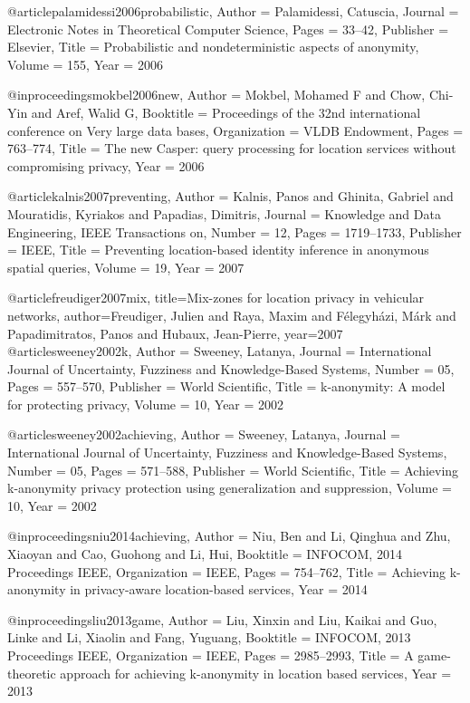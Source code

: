 {{{{{{{	@article{palamidessi2006probabilistic,
	Author = {Palamidessi, Catuscia},
	Journal = {Electronic Notes in Theoretical Computer Science},
	Pages = {33--42},
	Publisher = {Elsevier},
	Title = {Probabilistic and nondeterministic aspects of anonymity},
	Volume = {155},
	Year = {2006}}
	
	@inproceedings{mokbel2006new,
	Author = {Mokbel, Mohamed F and Chow, Chi-Yin and Aref, Walid G},
	Booktitle = {Proceedings of the 32nd international conference on Very large data bases},
	Organization = {VLDB Endowment},
	Pages = {763--774},
	Title = {The new Casper: query processing for location services without compromising privacy},
	Year = {2006}}
	
	@article{kalnis2007preventing,
	Author = {Kalnis, Panos and Ghinita, Gabriel and Mouratidis, Kyriakos and Papadias, Dimitris},
	Journal = {Knowledge and Data Engineering, IEEE Transactions on},
	Number = {12},
	Pages = {1719--1733},
	Publisher = {IEEE},
	Title = {Preventing location-based identity inference in anonymous spatial queries},
	Volume = {19},
	Year = {2007}}
	
	@article{freudiger2007mix,
	title={Mix-zones for location privacy in vehicular networks},
	author={Freudiger, Julien and Raya, Maxim and F{\'e}legyh{\'a}zi, M{\'a}rk and Papadimitratos, Panos and Hubaux, Jean-Pierre},
	year={2007}
	}
	@article{sweeney2002k,
	Author = {Sweeney, Latanya},
	Journal = {International Journal of Uncertainty, Fuzziness and Knowledge-Based Systems},
	Number = {05},
	Pages = {557--570},
	Publisher = {World Scientific},
	Title = {k-anonymity: A model for protecting privacy},
	Volume = {10},
	Year = {2002}}
	
	@article{sweeney2002achieving,
	Author = {Sweeney, Latanya},
	Journal = {International Journal of Uncertainty, Fuzziness and Knowledge-Based Systems},
	Number = {05},
	Pages = {571--588},
	Publisher = {World Scientific},
	Title = {Achieving k-anonymity privacy protection using generalization and suppression},
	Volume = {10},
	Year = {2002}}
	
	@inproceedings{niu2014achieving,
	Author = {Niu, Ben and Li, Qinghua and Zhu, Xiaoyan and Cao, Guohong and Li, Hui},
	Booktitle = {INFOCOM, 2014 Proceedings IEEE},
	Organization = {IEEE},
	Pages = {754--762},
	Title = {Achieving k-anonymity in privacy-aware location-based services},
	Year = {2014}}
	
	@inproceedings{liu2013game,
	Author = {Liu, Xinxin and Liu, Kaikai and Guo, Linke and Li, Xiaolin and Fang, Yuguang},
	Booktitle = {INFOCOM, 2013 Proceedings IEEE},
	Organization = {IEEE},
	Pages = {2985--2993},
	Title = {A game-theoretic approach for achieving k-anonymity in location based services},
	Year = {2013}}
	
}}}}}}}
